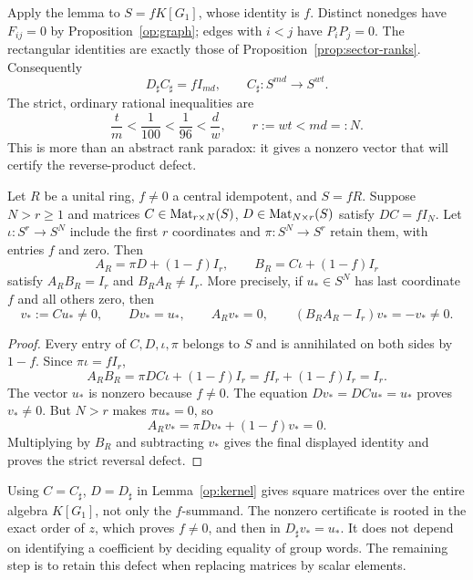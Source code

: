 Apply the lemma to $S=fK[G_1]$, whose identity is $f$. Distinct
nonedges have $F_{ij}=0$ by Proposition~\ref{op:graph}; edges with
$i<j$ have $P_iP_j=0$. The rectangular identities are exactly those
of Proposition~\ref{prop:sector-ranks}. Consequently
\begin{equation}\label{op:split}
 D_\sharp C_\sharp=fI_{md},\qquad
 C_\sharp:S^{md}\longrightarrow S^{wt}.
\end{equation}
The strict, ordinary rational inequalities are
\[
 \frac t m<\frac1{100}<\frac1{96}<\frac d w,\qquad
 r:=wt<md=:N.
\]
This is more than an abstract rank paradox: it gives a nonzero vector
that will certify the reverse-product defect.

\begin{lemma}\label{op:kernel}
Let $R$ be a unital ring, $f\ne0$ a central idempotent, and $S=fR$.
Suppose $N>r\ge1$ and matrices
$C\in\operatorname{Mat}_{r\times N}(S)$, $D\in\operatorname{Mat}_{N\times r}(S)$ satisfy
$DC=fI_N$. Let $\iota:S^r\to S^N$ include the first $r$ coordinates
and $\pi:S^N\to S^r$ retain them, with entries $f$ and zero. Then
\[
 A_R=\pi D+(1-f)I_r,\qquad B_R=C\iota+(1-f)I_r
\]
satisfy $A_RB_R=I_r$ and $B_RA_R\ne I_r$. More precisely, if
$u_*\in S^N$ has last coordinate $f$ and all others zero, then
\[
 v_*:=Cu_*\ne0,\qquad Dv_*=u_*,\qquad
 A_Rv_*=0,\qquad (B_RA_R-I_r)v_*=-v_*\ne0.
\]
\end{lemma}
\begin{proof}
Every entry of $C,D,\iota,\pi$ belongs to $S$ and is annihilated on
both sides by $1-f$. Since $\pi\iota=fI_r$,
\[
 A_RB_R=\pi DC\iota+(1-f)I_r=fI_r+(1-f)I_r=I_r.
\]
The vector $u_*$ is nonzero because $f\ne0$. The equation
$Dv_*=DCu_*=u_*$ proves $v_*\ne0$. But $N>r$ makes
$\pi u_*=0$, so
\[
 A_Rv_*=\pi Dv_*+(1-f)v_*=0.
\]
Multiplying by $B_R$ and subtracting $v_*$ gives the final displayed
identity and proves the strict reversal defect.
\end{proof}

Using $C=C_\sharp$, $D=D_\sharp$ in Lemma~\ref{op:kernel} gives
square matrices over the entire algebra $K[G_1]$, not only the
$f$-summand. The nonzero certificate is rooted in the exact order of
$z$, which proves $f\ne0$, and then in $D_\sharp v_*=u_*$. It does
not depend on identifying a coefficient by deciding equality of group
words. The remaining step is to retain this defect when replacing
matrices by scalar elements.
